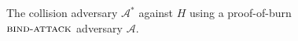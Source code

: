 \begin{figure}[t]
\begin{algorithm}[H]
    \caption{\label{alg.collision-adversary-crs} The collision adversary $\mathcal{A}^*$ against $H$ using a proof-of-burn $\textsc{bind}\-\text{-}\-\textsc{attack}$ adversary $\mathcal{A}$.}
    \begin{algorithmic}[1]
            \State{}
        \EndFunction
    \end{algorithmic}
\end{algorithm}
\end{figure}
